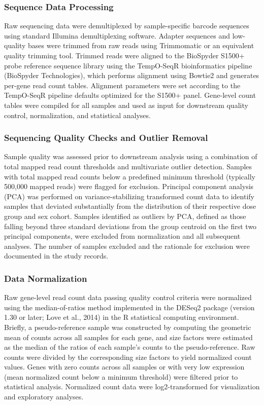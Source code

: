 \subsubsection{Sequence Data Processing}

Raw sequencing data were demultiplexed by sample-specific barcode sequences using standard Illumina demultiplexing software. Adapter sequences and low-quality bases were trimmed from raw reads using Trimmomatic or an equivalent quality trimming tool. Trimmed reads were aligned to the BioSpyder S1500+ probe reference sequence library using the TempO-SeqR bioinformatics pipeline (BioSpyder Technologies), which performs alignment using Bowtie2 and generates per-gene read count tables. Alignment parameters were set according to the TempO-SeqR pipeline defaults optimized for the S1500+ panel. Gene-level count tables were compiled for all samples and used as input for downstream quality control, normalization, and statistical analyses.

\subsubsection{Sequencing Quality Checks and Outlier Removal}

Sample quality was assessed prior to downstream analysis using a combination of total mapped read count thresholds and multivariate outlier detection. Samples with total mapped read counts below a predefined minimum threshold (typically 500,000 mapped reads) were flagged for exclusion. Principal component analysis (PCA) was performed on variance-stabilizing transformed count data to identify samples that deviated substantially from the distribution of their respective dose group and sex cohort. Samples identified as outliers by PCA, defined as those falling beyond three standard deviations from the group centroid on the first two principal components, were excluded from normalization and all subsequent analyses. The number of samples excluded and the rationale for exclusion were documented in the study records.

\subsubsection{Data Normalization}

Raw gene-level read count data passing quality control criteria were normalized using the median-of-ratios method implemented in the DESeq2 package (version 1.30 or later; Love et al., 2014) in the R statistical computing environment. Briefly, a pseudo-reference sample was constructed by computing the geometric mean of counts across all samples for each gene, and size factors were estimated as the median of the ratios of each sample's counts to the pseudo-reference. Raw counts were divided by the corresponding size factors to yield normalized count values. Genes with zero counts across all samples or with very low expression (mean normalized count below a minimum threshold) were filtered prior to statistical analysis. Normalized count data were log2-transformed for visualization and exploratory analyses.

